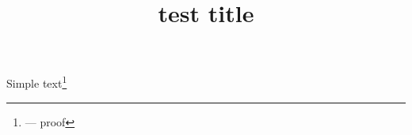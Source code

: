 \documentclass{article}
\title{test title}
\begin{document}
Simple text\footnote{--- proof}
\end{document}
